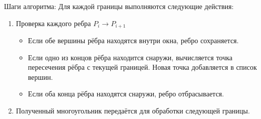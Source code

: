 Шаги алгоритма: Для каждой границы выполняются следующие действия:
\begin{enumerate}
    \item Проверка каждого ребра $P_i \rightarrow P_{i+1}$
          \begin{itemize}
              \item Если обе вершины рёбра находятся внутри окна, ребро сохраняется.
              \item Если одно из концов рёбра находится снаружи, вычисляется точка пересечения рёбра с текущей границей. Новая точка добавляется в список вершин.
              \item Если оба конца рёбра находятся снаружи, ребро отбрасывается.
          \end{itemize}
    \item Полученный многоугольник передаётся для обработки следующей границы.
\end{enumerate}
